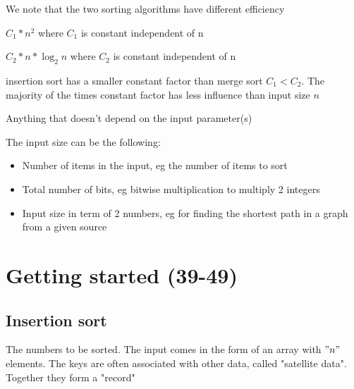 \begin{eg}\label{eg:insertion_sort_vs_merge_sort_1}
  We note that the two sorting algorithms have different efficiency
  \begin{note}\label{note:insertion_sort_1}
    $C_1*n^2$ where $C_1$ is constant independent of n
  \end{note}

  \begin{note}\label{note:merge_sort_1}
    $C_2 * n * \log_{2}n$ where $C_2$ is constant independent of n
  \end{note}

  \begin{remark}\label{def:constant_factor_1}
    insertion sort has a smaller constant factor than merge sort $C_1 < C_2$. The majority of the times constant factor has less influence than input size $n$
  \end{remark}

  \begin{definition}\label{def:constant_factor_2}
      Anything that doesn't depend on the input parameter(s)
  \end{definition}

  \begin{definition}\label{def:constant_factor_2}
      The input size can be the following:

      \begin{itemize}
          \item Number of items in the input, eg the number of items to sort
          \item Total number of bits, eg bitwise multiplication to multiply 2 integers
          \item Input size in term of 2 numbers, eg for finding the shortest path in a graph from a given source
      \end{itemize}
  \end{definition}

  \end{eg}

  \chapter{Getting started (39-49)}

  \section{Insertion sort}
  \begin{definition}[keys]\label{def:keys_1}
      The numbers to be sorted. The input comes in the form of an array with $"n"$ elements. The keys are often associated with other data, called "satellite data". Together they form a "record" 
  \end{definition}

